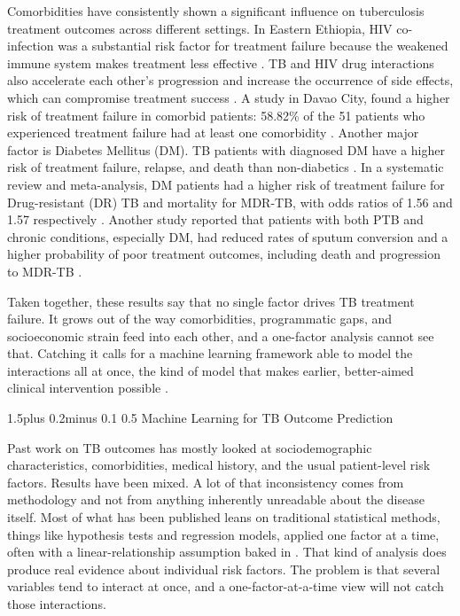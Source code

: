 \documentclass[12pt]{article}
\makeatletter
\renewcommand{\_}{\textunderscore\allowbreak}
\renewcommand{\subsection}{\@startsection{subsection}{2}{0pt}%
  {1.5\baselineskip plus 0.2\baselineskip minus 0.1\baselineskip}%
  {0.5\baselineskip}%
  {\bfseries\normalsize}}
\makeatother
\begin{document}
Comorbidities have consistently shown a significant influence on tuberculosis treatment outcomes across different settings. In Eastern Ethiopia, HIV co-infection was a substantial risk factor for treatment failure because the weakened immune system makes treatment less effective \citep{ref2}. TB and HIV drug interactions also accelerate each other's progression and increase the occurrence of side effects, which can compromise treatment success \citep{ref3}. A study in Davao City, found a higher risk of treatment failure in comorbid patients: 58.82\% of the 51 patients who experienced treatment failure had at least one comorbidity \citep{ref9}. Another major factor is Diabetes Mellitus (DM). TB patients with diagnosed DM have a higher risk of treatment failure, relapse, and death than non-diabetics \citep{ref14}. In a systematic review and meta-analysis, DM patients had a higher risk of treatment failure for Drug-resistant (DR) TB and mortality for MDR-TB, with odds ratios of 1.56 and 1.57 respectively \citep{ref22}. Another study reported that patients with both PTB and chronic conditions, especially DM, had reduced rates of sputum conversion and a higher probability of poor treatment outcomes, including death and progression to MDR-TB \citep{ref17}.

Taken together, these results say that no single factor drives TB treatment failure. It grows out of the way comorbidities, programmatic gaps, and socioeconomic strain feed into each other, and a one-factor analysis cannot see that. Catching it calls for a machine learning framework able to model the interactions all at once, the kind of model that makes earlier, better-aimed clinical intervention possible \citep{ref2, ref9, ref14, ref15, ref16, ref22, ref25, ref28, ref30}.

\subsection{Machine Learning for TB Outcome Prediction}

Past work on TB outcomes has mostly looked at sociodemographic characteristics, comorbidities, medical history, and the usual patient-level risk factors. Results have been mixed. A lot of that inconsistency comes from methodology and not from anything inherently unreadable about the disease itself. Most of what has been published leans on traditional statistical methods, things like hypothesis tests and regression models, applied one factor at a time, often with a linear-relationship assumption baked in \citep{ref2}. That kind of analysis does produce real evidence about individual risk factors. The problem is that several variables tend to interact at once, and a one-factor-at-a-time view will not catch those interactions.
\end{document}
